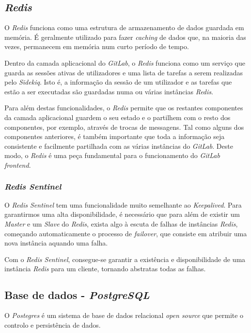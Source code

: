 \documentclass[12pt,a4paper]{article}
\begin{document}
\subsection{\emph{Redis}}

O \emph{Redis} funciona como uma estrutura de armazenamento de dados guardada em memória. É geralmente utilizado para fazer \emph{caching} de dados que, na maioria das vezes, permanecem em memória num curto período de tempo.

Dentro da camada aplicacional do \emph{GitLab}, o \emph{Redis} funciona como um serviço que guarda as sessões ativas de utilizadores e uma lista de tarefas a serem realizadas pelo \emph{Sidekiq}. Isto é, a informação da sessão de um utilizador e as tarefas que estão a ser executadas são guardadas numa ou várias instâncias \emph{Redis}.

Para além destas funcionalidades, o \emph{Redis} permite que os restantes componentes da camada aplicacional guardem o seu estado e o partilhem com o resto dos componentes, por exemplo, através de trocas de messagens. Tal como alguns dos componentes anteriores, é também importante que toda a informação seja consistente e facilmente partilhada com as várias instâncias do \emph{GitLab}. Deste modo, o \emph{Redis} é uma peça fundamental para o funcionamento do \emph{GitLab frontend}.

\subsubsection{\emph{Redis Sentinel}}

O \emph{Redis Sentinel} tem uma funcionalidade muito semelhante ao \emph{Keepalived}. Para garantirmos uma alta disponibilidade, é necessário que para além de existir um \emph{Master} e um \emph{Slave} do \emph{Redis}, exista algo à escuta de falhas de instâncias \emph{Redis}, começando automaticamente o processo de \emph{failover}, que consiste em atribuir uma nova instância aquando uma falha.

Com o \emph{Redis Sentinel}, consegue-se garantir a existência e disponibilidade de uma instância \emph{Redis} para um cliente, tornando abstratas todas as falhas.




\subsection{Base de dados - \emph{PostgreSQL}}
O \emph{Postegres} é um sistema de base de dados relacional \emph{open source} que permite o controlo e  persistência de dados.
\end{document}
